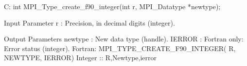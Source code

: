 C:
int MPI_Type_create_f90_integer(int r, MPI_Datatype *newtype);

Input Parameter
r : Precision, in decimal digits (integer).

Output Parameters
newtype : New data type (handle).
IERROR : Fortran only: Error status (integer).
Fortran:
MPI_TYPE_CREATE_F90_INTEGER( R, NEWTYPE, IERROR)
Integer :: R,Newtype,ierror

